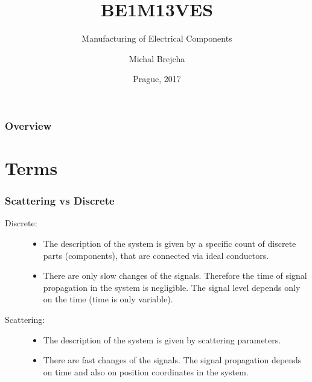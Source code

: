 \documentclass{beamer}
\title[BE1M13VES]{BE1M13VES}
\subtitle[Manufacturing of Electrical Components] {Manufacturing of Electrical Components}
\author[Brejcha]{Michal Brejcha}
\institute[CTU]{CTU in Prague}
\date[Prague, 2017]{Prague, 2017}
\begin{document}
\frame{\titlepage}

\begin{frame}
\frametitle{Overview} 
\tableofcontents
\end{frame}

\section{\texorpdfstring{Terms}{Terms}}
  \begin{frame}
    \frametitle{Scattering vs Discrete}
		\begin{description}
			\item[Discrete:] 
				\begin{itemize}
					\item The description of the system is given by a specific count of discrete parts (components), that are connected via ideal conductors.
					\item There are only slow changes of the signals. Therefore the time of signal propagation in the system is negligible. The signal level depends only on the time (time is only variable).
				\end{itemize}
			\item[Scattering:]
				\begin{itemize}
					\item The description of the system is given by scattering parameters.
					\item There are fast changes of the signals. The signal propagation depends on time and also on position coordinates in the system.
				\end{itemize}
		\end{description}
  \end{frame}
\end{document}
